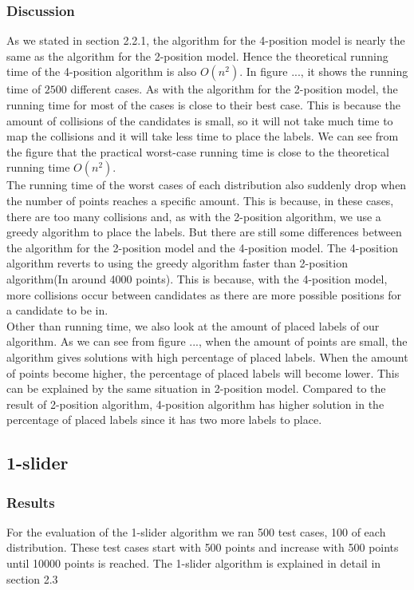 \documentclass[crop=false,a4paper,oneside,11pt]{standalone}
\begin{document}
\subsubsection{Discussion}
As we stated in section 2.2.1, the algorithm for the 4-position model is nearly the same as the algorithm for the 2-position model. Hence the theoretical running time of the 4-position algorithm is also $O(n^2)$. In figure ..., it shows the running time of $2500$ different cases. As with the algorithm for the 2-position model, the running time for most of the cases is close to their best case. This is because the amount of collisions of the candidates is small, so it will not take much time to map the collisions and it will take less time to place the labels. We can see from the figure that the practical worst-case running time is close to the theoretical running time $O(n^2)$. \\
The running time of the worst cases of each distribution also suddenly drop when the number of points reaches a specific amount. This is because, in these cases, there are too many collisions and, as with the 2-position algorithm, we use a greedy algorithm to place the labels. But there are still some differences between the algorithm for the 2-position model and the 4-position model. The 4-position algorithm reverts to using the greedy algorithm faster than 2-position algorithm(In around 4000 points). This is because, with the 4-position model, more collisions occur between candidates as there are more possible positions for a candidate to be in.\\
Other than running time, we also look at the amount of placed labels of our algorithm. As we can see from figure ..., when the amount of points are small, the algorithm gives solutions with high percentage of placed labels. When the amount of points become higher, the percentage of placed labels will become lower. This can be explained by the same situation in 2-position model. Compared to the result of 2-position algorithm, 4-position algorithm has higher solution in the percentage of placed labels since it has two more labels to place.\\

\subsection{1-slider}
\subsubsection{Results}
For the evaluation of the 1-slider algorithm we ran 500 test cases, 100 of each distribution. These test cases start with 500 points and increase with 500 points until 10000 points is reached. The 1-slider algorithm is explained in detail in section 2.3
\end{document}
